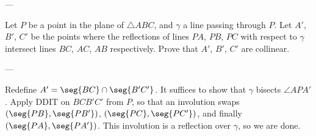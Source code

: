 
---

Let $P$ be a point in the plane of $\triangle ABC$, and $\gamma$ a line passing through $P$. Let $A'$, $B'$, $C'$ be the points where the reflections of lines $PA$, $PB$, $PC$ with respect to $\gamma$ intersect lines $BC$, $AC$, $AB$ respectively. Prove that $A'$, $B'$, $C'$ are collinear.

---

Redefine $A'=\seg{BC}\cap\seg{B'C'}$. It suffices to show that $\gamma$ bisects $\angle APA'$. Apply DDIT on $BCB'C'$ from $P$, so that an involution swaps $(\seg{PB},\seg{PB'})$, $(\seg{PC},\seg{PC'})$, and finally $(\seg{PA},\seg{PA'})$. This involution is a reflection over $\gamma$, so we are done.

